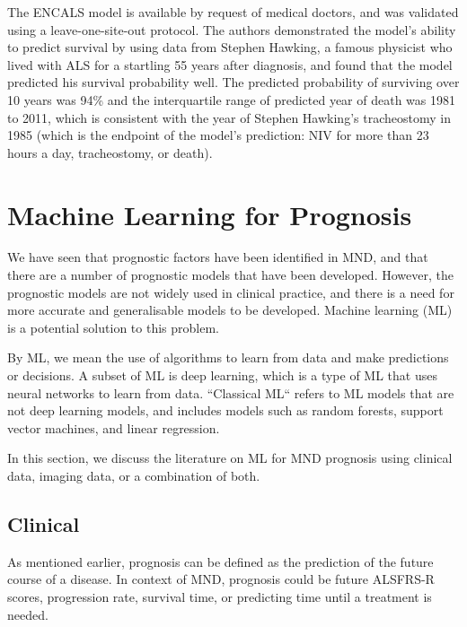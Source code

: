 The ENCALS model is available by request of medical doctors, and was validated using a leave-one-site-out protocol.
The authors demonstrated the model's ability to predict survival by using data from Stephen Hawking, a famous physicist who lived with ALS for a startling 55 years after diagnosis, and found that the model predicted his survival probability well.
The predicted probability of surviving over 10 years was 94\% and the interquartile range of predicted year of death was 1981 to 2011, which is consistent with the year of Stephen Hawking's tracheostomy in 1985 (which is the endpoint of the model's prediction: NIV for more than 23 hours a day, tracheostomy, or death).


\section{Machine Learning for Prognosis}

We have seen that prognostic factors have been identified in MND, and that there are a number of prognostic models that have been developed.
However, the prognostic models are not widely used in clinical practice, and there is a need for more accurate and generalisable models to be developed.
Machine learning (ML) is a potential solution to this problem.

By ML, we mean the use of algorithms to learn from data and make predictions or decisions.
A subset of ML is deep learning, which is a type of ML that uses neural networks to learn from data.
``Classical ML`` refers to ML models that are not deep learning models, and includes models such as random forests, support vector machines, and linear regression.

In this section, we discuss the literature on ML for MND prognosis using clinical data, imaging data, or a combination of both.

\subsection{Clinical}


As mentioned earlier, prognosis can be defined as the prediction of the future course of a disease.
In context of MND, prognosis could be future ALSFRS-R scores, progression rate, survival time, or predicting time until a treatment is needed.

